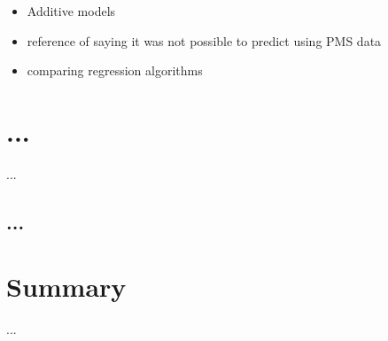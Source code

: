 \vspace{5mm}

\begin{itemize}
\item Additive models

\item reference of saying it was not possible to predict using PMS data
\item comparing regression algorithms
\end{itemize}





\section{...}
...


\subsection{...}


\section{Summary}
...


